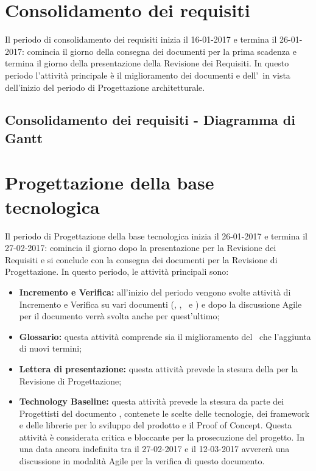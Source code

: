 \documentclass[PianoDiProgetto.tex]{subfiles}
\begin{document}
\section{Consolidamento dei requisiti}
Il periodo di consolidamento dei requisiti inizia il 16-01-2017 e termina il 26-01-2017: comincia il giorno della consegna dei documenti per la prima scadenza e termina il giorno della presentazione della Revisione dei Requisiti. In questo periodo l'attività principale è il miglioramento dei documenti e dell'\adr\ in vista dell'inizio del periodo di Progettazione architetturale.
\subsection{Consolidamento dei requisiti - Diagramma di Gantt}
		


\section{Progettazione della base tecnologica}
Il periodo di Progettazione della base tecnologica inizia il 26-01-2017 e termina il 27-02-2017: comincia il giorno dopo la presentazione per la Revisione dei Requisiti e si conclude con la consegna dei documenti per la Revisione di Progettazione. In questo periodo, le attività principali sono:
\begin{itemize}
	\item \textbf{Incremento e Verifica:} all'inizio del periodo vengono svolte attività di Incremento e Verifica su vari documenti (\ndp, \pdp, \pdq\ e \adr) e dopo la discussione Agile per il documento \tb verrà svolta anche per quest'ultimo;
	\item \textbf{Glossario:} questa attività comprende sia il miglioramento del \g\ che l'aggiunta di nuovi termini;
	\item \textbf{Lettera di presentazione:} questa attività prevede la stesura della  per la Revisione di Progettazione;
	\item \textbf{Technology Baseline:} questa attività prevede la stesura da parte dei Progettisti del documento \tb, contenete le scelte delle tecnologie, dei framework e delle librerie per lo sviluppo del prodotto e il Proof of Concept. Questa attività è considerata critica e bloccante per la prosecuzione del progetto. In una data ancora indefinita tra il 27-02-2017 e il 12-03-2017 avvererà una discussione in modalità Agile per la verifica di questo documento.
\end{itemize}
\end{document}
